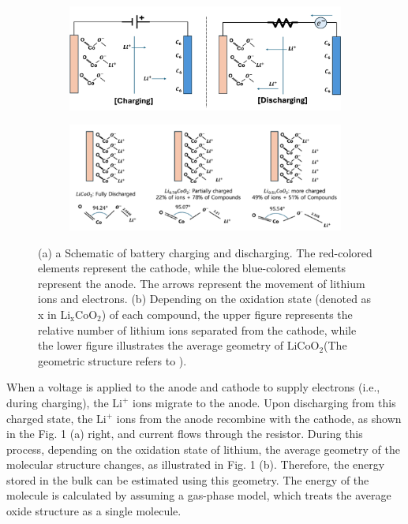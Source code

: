\documentclass[pdflatex,sn-mathphys-num]{sn-jnl}%
\theoremstyle{thmstyleone}%
\theoremstyle{thmstyletwo}%
\theoremstyle{thmstylethree}%
\begin{document}
\begin{figure}[H]
  \centering
  \begin{subfigure}[b]{0.45\textwidth}
    \includegraphics[width=\textwidth]{fig/Cha_discha.png}
    \caption{}
    \label{fig:first}
  \end{subfigure}
  \hfill
  \hfill
  \begin{subfigure}[b]{0.45\textwidth}
    \includegraphics[width=\textwidth]{fig/char.png}
    \caption{}
    \label{fig:second}
  \end{subfigure}
  \caption{(a) a Schematic of battery charging and discharging. The red-colored elements represent the cathode, while the blue-colored elements represent the anode. The arrows represent the movement of lithium ions and electrons. (b) Depending on the oxidation state (denoted as x in \(\mathrm{Li_xCoO_2}\)) of each compound, the upper figure represents the relative number of lithium ions separated from the cathode, while the lower figure illustrates the average geometry of \(\mathrm{LiCoO_2}\)(The geometric structure refers to \cite{LICOO21}).}
  \label{fig:two_figures_side_by_side}
\end{figure}

When a voltage is applied to the anode and cathode to supply electrons (i.e., during charging), the  \(\mathrm{Li^+}\) ions migrate to the anode. Upon discharging from this charged state, the \(\mathrm{Li^+}\) ions from the anode recombine with the cathode, as shown in the Fig. 1 (a) right, and current flows through the resistor. During this process, depending on the oxidation state of lithium, the average geometry of the molecular structure changes, as illustrated in Fig. 1 (b). Therefore, the energy stored in the bulk can be estimated using this geometry. The energy of the molecule is calculated by assuming a gas-phase model, which treats the average oxide structure as a single molecule.
\end{document}
